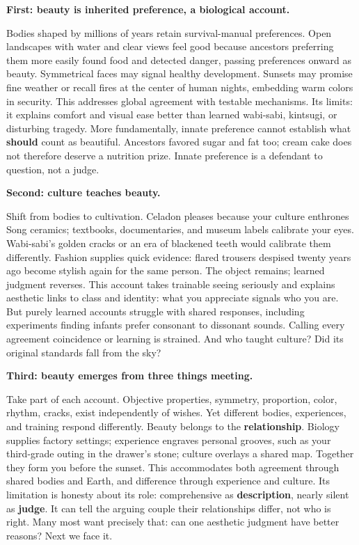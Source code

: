 \textbf{First: beauty is inherited preference, a biological account.}

Bodies shaped by millions of years retain survival-manual preferences. Open landscapes with water and clear views feel good because ancestors preferring them more easily found food and detected danger, passing preferences onward as beauty. Symmetrical faces may signal healthy development. Sunsets may promise fine weather or recall fires at the center of human nights, embedding warm colors in security. This addresses global agreement with testable mechanisms. Its limits: it explains comfort and visual ease better than learned wabi-sabi, kintsugi, or disturbing tragedy. More fundamentally, innate preference cannot establish what \textbf{should} count as beautiful. Ancestors favored sugar and fat too; cream cake does not therefore deserve a nutrition prize. Innate preference is a defendant to question, not a judge.

\textbf{Second: culture teaches beauty.}

Shift from bodies to cultivation. Celadon pleases because your culture enthrones Song ceramics; textbooks, documentaries, and museum labels calibrate your eyes. Wabi-sabi's golden cracks or an era of blackened teeth would calibrate them differently. Fashion supplies quick evidence: flared trousers despised twenty years ago become stylish again for the same person. The object remains; learned judgment reverses. This account takes trainable seeing seriously and explains aesthetic links to class and identity: what you appreciate signals who you are. But purely learned accounts struggle with shared responses, including experiments finding infants prefer consonant to dissonant sounds. Calling every agreement coincidence or learning is strained. And who taught culture? Did its original standards fall from the sky?

\textbf{Third: beauty emerges from three things meeting.}

Take part of each account. Objective properties, symmetry, proportion, color, rhythm, cracks, exist independently of wishes. Yet different bodies, experiences, and training respond differently. Beauty belongs to the \textbf{relationship}. Biology supplies factory settings; experience engraves personal grooves, such as your third-grade outing in the drawer's stone; culture overlays a shared map. Together they form you before the sunset. This accommodates both agreement through shared bodies and Earth, and difference through experience and culture. Its limitation is honesty about its role: comprehensive as \textbf{description}, nearly silent as \textbf{judge}. It can tell the arguing couple their relationships differ, not who is right. Many most want precisely that: can one aesthetic judgment have better reasons? Next we face it.

